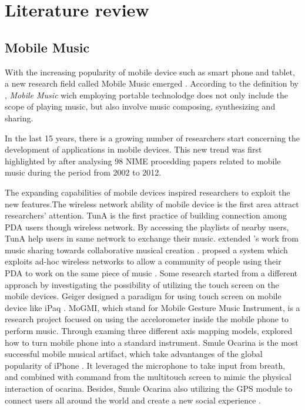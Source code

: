 \chapter{Literature review}

\section{Mobile Music}

With the increasing popularity of mobile device such as smart phone and tablet, a new research field called Mobile Music emerged \citep{Reference4}. According to the definition by \citeauthor{Reference6}, \textit{Mobile Music} wich employing portable technolodge does not only include the scope of playing music, but also involve music composing, synthesizing and sharing\citep{Reference6}.

In the last 15 years, there is a growing number of researchers start concerning the development of applications in mobile devices. This new trend was first highlighted by \citeauthor{Reference12} after analysing 98 NIME procedding papers related to mobile music during the period from 2002 to 2012\citep{Reference12}.

The expanding capabilities of mobile devices inspired researchers to exploit the new features.The wireless network ability of mobile device is the first area attract researchers' attention. TunA is the first practice of building connection among PDA users though wireless network\citep{Reference7}. By accessing the playlists of nearby users, TunA help users in same network to exchange their music. \citeauthor{Reference5} extended \citeauthor{Reference7}'s work from music sharing towards collaborative musical creation \citep{Reference5}. \citeauthor{Reference5} propsed a system which exploits ad-hoc wireless networks to allow a community of people using their PDA to work on the same piece of music \citep{Reference5}. Some research started from a different approach by investigating the possibility of utilizing the touch screen on the mobile devices. Geiger designed a paradigm for using touch screen on mobile device like iPaq \citep{Reference9, Reference10}.
MoGMI, which stand for Mobile Gesture Music Instrument, is a research project focused on using the accelorometer inside the mobile phone to perform music. Through examing three different axis mapping models, \citeauthor{Reference11} explored how to turn mobile phone into a standard instrument. Smule Ocarina is the most successful mobile musical artifact, which take advantanges of the global popularity of iPhone \citep{Reference8.1}. It leveraged the microphone to take input from breath, and combined with command from the multitouch screen to mimic the physical interaction of ocarina. Besides, Smule Ocarina also utilizing the GPS module to connect users all around the world and create a new social experience \citep{Reference8}.



